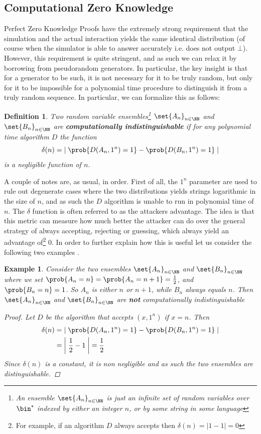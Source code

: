\documentclass{article}
\newtheorem{definition}{Definition}
\newtheorem{example}{Example}
\begin{document}
\subsection{Computational Zero Knowledge}
Perfect Zero Knowledge Proofs have the extremely strong requirement that the simulation and the actual interaction yields the same identical distribution (of course when the simulator is able to answer accurately i.e. does not output $\bot$). However, this requirement is quite stringent, and as such we can relax it by borrowing from pseudorandom generators. In particular, the key insight is that for a generator to be such, it is not necessary for it to be truly random, but only for it to be impossible for a polynomial time procedure to distinguish it from a truly random sequence. In particular, we can formalize this as follows:
\begin{definition}
    Two random variable ensembles\footnote{An ensemble $\set{A_n}_{n \in \NN}$ is just an infinite set of random variables over $\bin^*$ indexed by either an integer $n$, or by some string in some language} $\set{A_n}_{n \in \NN}$ and $\set{B_n}_{n \in \NN}$ are \textbf{computationally indistinguishable} if for any polynomial time algorithm $D$ the function
    \[ \delta(n) = \left| \; \prob{D(A_n, 1^n) = 1} - \prob{D(B_n, 1^n) = 1} \;  \right|  \] is a negligible function of $n$.
\end{definition}
A couple of notes are, as usual, in order. First of all, the $1^n$ parameter are used to rule out degenerate cases where the two distributions yields strings logarithmic in the size of $n$, and as such the $D$ algorithm is unable to run in polynomial time of $n$. The $\delta$ function is often referred to as the attackers advantage. The idea is that this metric can measure how much better the attacker can do over the general strategy of always accepting, rejecting or guessing, which always yield an advantage of\footnote{For example, if an algorithm $D$ always accepts then $\delta(n) = |1 - 1| = 0$} 0.
In order to further explain how this is useful let us consider the following two examples \cite{ProvableSecurityComputational}.

\begin{example}
    Consider the two ensembles $\set{A_n}_{n \in \NN}$ and $\set{B_n}_{n \in \NN}$ where we set $\prob{A_n = n} = \prob{A_n = n+1} = \frac{1}{2}$, and $\prob{B_n = n} = 1$. So $A_n$ is either $n$ or $n+1$, while $B_n$ always equals $n$. Then $\set{A_n}_{n \in \NN}$ and $\set{B_n}_{n \in \NN}$ are \textbf{not} computationally indistinguishable
    \begin{proof}
        Let $D$ be the algorithm that accepts $(x, 1^n)$ if $x = n$. Then
        \begin{align*}
            \delta(n) & = \left| \; \prob{D(A_n, 1^n) = 1} - \prob{D(B_n, 1^n) = 1} \;  \right| \\
                      & = \left| \; \frac{1}{2} - 1 \;  \right| = \frac{1}{2}
        \end{align*}
        Since $\delta(n)$ is a constant, it is non negligible and as such the two ensembles are distinguishable.
    \end{proof}
\end{example}
\end{document}
